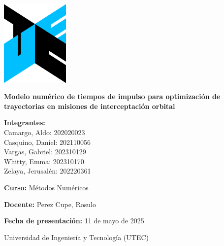 \begin{titlepage}
    \pagestyle{empty}
    \begin{center}
        \includegraphics[width=0.25\textwidth]{isologo-utec.png} %
        \vspace{1cm}

        {\LARGE\textbf{Modelo numérico de tiempos de impulso para optimización de trayectorias en misiones de interceptación orbital}}
        \vspace{1.5cm}

        {\large
            \textbf{Integrantes:} \\
            Camargo, Aldo: 202020023 \\
            Casquino, Daniel: 202110056 \\
            Vargas, Gabriel: 202310129 \\
            Whitty, Emma: 202310170 \\
            Zelaya, Jerusalén: 202220361 \\
        }
        \vspace{1cm}

        {\large
            \textbf{Curso:} Métodos Numéricos
        }
        \vspace{0.5cm}

        {\large
            \textbf{Docente:} Perez Cupe, Rosulo
        }
        \vspace{0.5cm}

        {\large
            \textbf{Fecha de presentación:} 11 de mayo de 2025
        }
        \vfill

        {\large
            Universidad de Ingeniería y Tecnología (UTEC)
        }
    \end{center}
\end{titlepage}